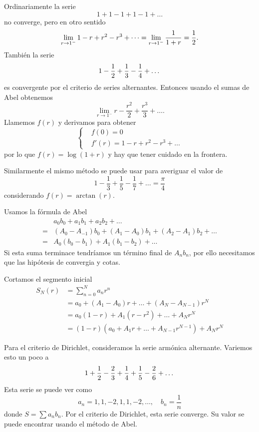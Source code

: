 \documentclass[12pt]{memoir}
\begin{document}
\begin{Ex}
    Ordinariamente la serie
    \[
    1+1-1+1-1+\dots
    \]
    no converge, pero en otro sentido
    \[\lim_{r\to1^{-}}1-r+r^2-r^3+\dots=\lim_{r\to1^{-}}\frac{1}{1+r}=\half.\]
    También la serie 
    \[
    1-\half+\frac13-\frac14+\dots
    \]
    es convergente por el criterio de series alternantes. Entonces usando el sumas de Abel obtenemos
    \[
    \lim_{r\to1^{-}}r-\frac{r^2}{2}+\frac{r^3}{3}+\dots.
    \]
    Llamemos \(f(r)\) y derivamos para obtener
    \[
    \begin{cases}
        &f(0)=0\\
        &f'(r)=1-r+r^2-r^3+\dots
    \end{cases}
    \]
    por lo que \(f(r)=\log(1+r)\) y hay que tener cuidado en la frontera.\par
    Similarmente el mismo método se puede usar para averiguar el valor de
    \[
        1-\frac13+\frac15-\frac17+\dots=\frac{\pi}{4}
    \]
    considerando \(f(r)=\arctan(r)\).
\end{Ex}

\begin{Ej}
    Usamos la fórmula de Abel
    \begin{align*}
        &a_0b_0+a_1b_1+a_2b_2+\dots\\
        =&(A_0-A_{-1})b_0+(A_1-A_0)b_1+(A_2-A_1)b_2+\dots\\
        =&A_0(b_0-b_1)+A_1(b_1-b_2)+\dots
    \end{align*}
    Si esta suma terminace tendríamos un término final de \(A_nb_n\), por ello necesitamos que las hipótesis de convergia y cotas.\par
    Cortamos el segmento inicial 
    \begin{align*}
        S_N(r)&=\sum_{n=0}^{N}a_nr^n\\
        &=a_0+(A_1-A_0)r+\dots+(A_N-A_{N-1})r^N\\
        &=a_0(1-r)+A_1(r-r^2)+\dots+A_Nr^N\\
        &=(1-r)\left(a_0+A_1r+\dots+A_{N-1}r^{N-1}\right)+A_Nr^N
    \end{align*}
\end{Ej}

Para el criterio de Dirichlet, consideramos la serie armónica alternante. Variemos esto un poco a 
\[
1+\half-\frac23+\frac14+\frac15-\frac26+\dots
\]
Esta serie se puede ver como 
\[
a_n=1,1,-2,1,1,-2,\dots,\quad b_n=\frac1n
\]
donde \(S=\sum a_nb_n\). Por el criterio de Dirichlet, esta serie converge. Su valor se puede encontrar usando el método de Abel.
\end{document}
